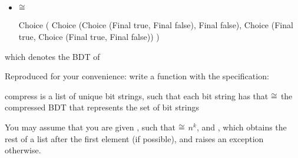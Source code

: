\documentclass[addpoints,12pt, answers]{exam}
\begin{document}
\begin{questions}
\begin{parts}
\begin{itemize}
      \begin{center}
      \end{center}
      \vspace{5pt}
      \item {} $\cong$
      \begin{codeblock}
        Choice
          ( Choice
              (Choice (Final true, Final false), Final false),
            Choice
              (Final true, Choice (Final true, Final false))
          )
      \end{codeblock}
    \end{itemize}
    which denotes the BDT of
    \begin{center}
    \end{center}

    \newpage

    Reproduced for your convenience: write a function  with the
    specification:

    \spec
      {compress}
      {}
      { is a list of unique bit strings, such that each bit string  has
      that }
      { $\cong$ the compressed BDT that
      represents the set of bit strings }

    You may assume that you are given , such that
     $\cong$ $n^k$, and , which
    obtains the rest of a list after the first element (if possible), and raises an exception otherwise.


\end{parts}
\end{questions}
\end{document}
